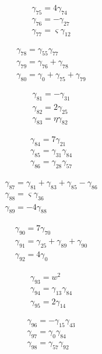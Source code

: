 \[\begin{aligned}\gamma_{75}=4 \gamma_{74}\\ \gamma_{76}=- \gamma_{27}\\ \gamma_{77}=\varsigma  \gamma_{12}\end{aligned}\]

\[\begin{aligned}\gamma_{78}=\gamma_{55} \gamma_{77}\\ \gamma_{79}=\gamma_{76} + \gamma_{78}\\ \gamma_{80}=\gamma_{0} + \gamma_{75} + \gamma_{79}\end{aligned}\]

\[\begin{aligned}\gamma_{81}=- \gamma_{31}\\ \gamma_{82}=2 \gamma_{25}\\ \gamma_{83}=\eta  \gamma_{82}\end{aligned}\]

\[\begin{aligned}\gamma_{84}=7 \gamma_{21}\\ \gamma_{85}=\gamma_{31} \gamma_{84}\\ \gamma_{86}=\gamma_{28} \gamma_{57}\end{aligned}\]

\[\begin{aligned}\gamma_{87}=\gamma_{81} + \gamma_{83} + \gamma_{85} - \gamma_{86}\\ \gamma_{88}=\varsigma  \gamma_{36}\\ \gamma_{89}=- 4 \gamma_{88}\end{aligned}\]

\[\begin{aligned}\gamma_{90}=7 \gamma_{70}\\ \gamma_{91}=\gamma_{25} + \gamma_{89} + \gamma_{90}\\ \gamma_{92}=4 \gamma_{0}\end{aligned}\]

\[\begin{aligned}\gamma_{93}=w^{2}\\ \gamma_{94}=\gamma_{13} \gamma_{84}\\ \gamma_{95}=2 \gamma_{14}\end{aligned}\]

\[\begin{aligned}\gamma_{96}=- \gamma_{15} \gamma_{43}\\ \gamma_{97}=\gamma_{0} \gamma_{84}\\ \gamma_{98}=\gamma_{57} \gamma_{92}\end{aligned}\]

